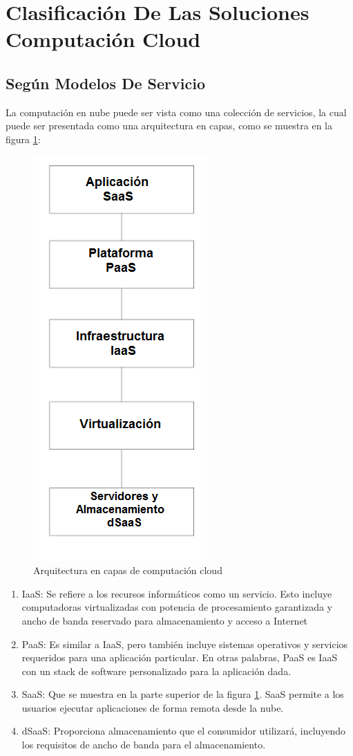 \documentclass[a4paper, 12pt]{report}
\begin{document}
\section{Clasificaci\'on De Las Soluciones Computaci\'on Cloud}
\subsection{Seg\'un Modelos De Servicio}
\begin{justify}
La computación en nube puede ser vista como una colección de servicios, la cual puede ser presentada como una arquitectura en capas, como se muestra en la figura \ref{fig:capas1}:
\begin{figure}[ht]
	\begin{center}
		\includegraphics[width=.3\textwidth]{cloudcapas}
		\caption{Arquitectura en capas de computaci\'on cloud \cite{handbook}}
		\label{fig:capas1}
	\end{center}
\end{figure}
\begin{enumerate}[label=\alph*)]
    \item{IaaS:} Se refiere a los recursos informáticos como un servicio. Esto incluye computadoras virtualizadas con potencia de procesamiento garantizada y ancho de banda reservado para almacenamiento y acceso a Internet
    \item{PaaS:} Es similar a IaaS, pero también incluye sistemas operativos y servicios requeridos para una aplicación particular. En otras palabras, PaaS es IaaS con un stack de software personalizado para la aplicación dada.
    \item{SaaS:} Que se muestra en la parte superior de la figura \ref{fig:capas1}. SaaS permite a los usuarios ejecutar aplicaciones de forma remota desde la nube.
    \item{dSaaS:} Proporciona almacenamiento que el consumidor utilizar\'a, incluyendo los requisitos de ancho de banda para el almacenamiento.
\end{enumerate}
\end{justify}
\end{document}
